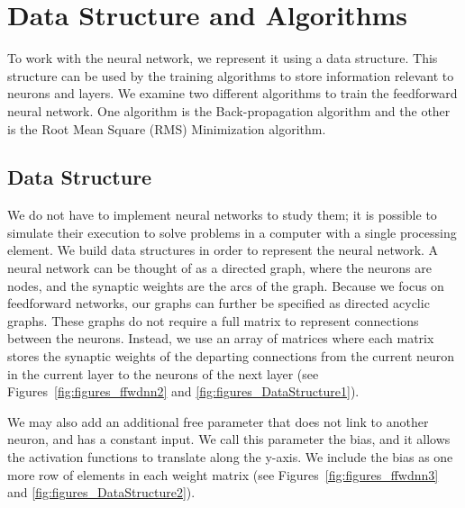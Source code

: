 \documentclass[11pt]{article}
\begin{document}


\section{Data Structure and Algorithms} %
\label{sec:data_structure_and_algorithms}

To work with the neural network, we represent it using a data structure. This structure can be used by the training algorithms to store
information relevant to neurons and layers. We examine two different algorithms to train the feedforward neural network. One algorithm
is the Back-propagation algorithm and the other is the Root Mean Square (RMS) Minimization algorithm.

\subsection{Data Structure} %
\label{sub:data_structure}

We do not have to implement neural networks to study them; it is possible to simulate their execution to solve problems in a computer
with a single processing element. We build data structures in order to represent the neural network. A neural network can be thought of
as a directed graph, where the neurons are nodes, and the synaptic weights are the arcs of the graph. Because we focus on feedforward
networks, our graphs can further be specified as directed acyclic graphs. These graphs do not require a full matrix to represent
connections between the neurons. Instead, we use an array of matrices where each matrix stores the synaptic weights of the departing
connections from the current neuron in the current layer to the neurons of the next layer (see Figures~\ref{fig:figures_ffwdnn2} and
\ref{fig:figures_DataStructure1}).

We may also add an additional free parameter that does not link to another neuron, and has a constant input. We call this parameter the
bias, and it allows the activation functions to translate along the y-axis. We include the bias as one more row of elements in each
weight matrix (see Figures~\ref{fig:figures_ffwdnn3} and \ref{fig:figures_DataStructure2}).
\end{document}
